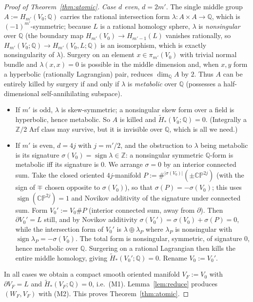 \documentclass[12pt]{article}
\theoremstyle{definition}
\begin{document}
\begin{proof}[Proof of Theorem~\ref{thm:atomic}]
\emph{Case $d$ even}, $d=2m'$. The single middle group $A:=H_{m'}(V_0;\mathbb{Q})$
carries the rational intersection form $\lambda\colon A\times A\to\mathbb{Q}$,
which is $(-1)^{m'}$-symmetric; because $L$ is a rational homology sphere,
$\lambda$ is \emph{nonsingular} over $\mathbb{Q}$ (the boundary map
$H_{m'}(V_0)\to H_{m'-1}(L)$ vanishes rationally, so
$H_{m'}(V_0;\mathbb{Q})\to H_{m'}(V_0,L;\mathbb{Q})$ is an isomorphism, which is
exactly nonsingularity of $\lambda$). Surgery on an element $x\in\pi_{m'}(V_0)$
with trivial normal bundle and $\lambda(x,x)=0$ is possible in the middle
dimension and, when $x,y$ form a hyperbolic (rationally Lagrangian) pair,
reduces $\dim_{\mathbb{Q}}A$ by $2$. Thus $A$ can be entirely killed by surgery
if and only if $\lambda$ is \emph{metabolic} over $\mathbb{Q}$ (possesses a
half-dimensional self-annihilating subspace).
\begin{itemize}
\item If $m'$ is odd, $\lambda$ is skew-symmetric; a nonsingular skew form over a
field is hyperbolic, hence metabolic. So $A$ is killed and
$\widetilde H_*(V_0;\mathbb{Q})=0$. (Integrally a $\mathbb{Z}/2$ Arf class may
survive, but it is invisible over $\mathbb{Q}$, which is all we need.)
\item If $m'$ is even, $d=4j$ with $j=m'/2$, and the obstruction to $\lambda$
being metabolic is its signature $\sigma(V_0)=\operatorname{sign}\lambda\in
\mathbb{Z}$: a nonsingular symmetric $\mathbb{Q}$-form is metabolic iff its
signature is $0$. We arrange $\sigma=0$ by an interior connected sum. Take the
closed oriented $4j$-manifold $P:=\#^{|\sigma(V_0)|}(\pm\mathbb{CP}^{2j})$
(with the sign of $\mp$ chosen opposite to $\sigma(V_0)$), so that
$\sigma(P)=-\sigma(V_0)$; this uses $\operatorname{sign}(\mathbb{CP}^{2j})=1$
and Novikov additivity of the signature under connected sum. Form
$V_0':=V_0\#P$ (interior connected sum, away from $\partial$). Then
$\partial V_0'=L$ still, and by Novikov additivity
$\sigma(V_0')=\sigma(V_0)+\sigma(P)=0$, while the intersection form of $V_0'$ is
$\lambda\oplus\lambda_P$ where $\lambda_P$ is nonsingular with
$\operatorname{sign}\lambda_P=-\sigma(V_0)$. The total form is nonsingular,
symmetric, of signature $0$, hence metabolic over $\mathbb{Q}$. Surgering on a
rational Lagrangian then kills the entire middle homology, giving
$\widetilde H_*(V_0';\mathbb{Q})=0$. Rename $V_0:=V_0'$.
\end{itemize}

\smallskip
In all cases we obtain a compact smooth oriented manifold $V_F:=V_0$ with
$\partial V_F=L$ and $\widetilde H_*(V_F;\mathbb{Q})=0$, i.e.\ (M1).
Lemma~\ref{lem:reduce} produces $(W_F,V_F)$ with (M2). This proves
Theorem~\ref{thm:atomic}.
\end{proof}
\end{document}
